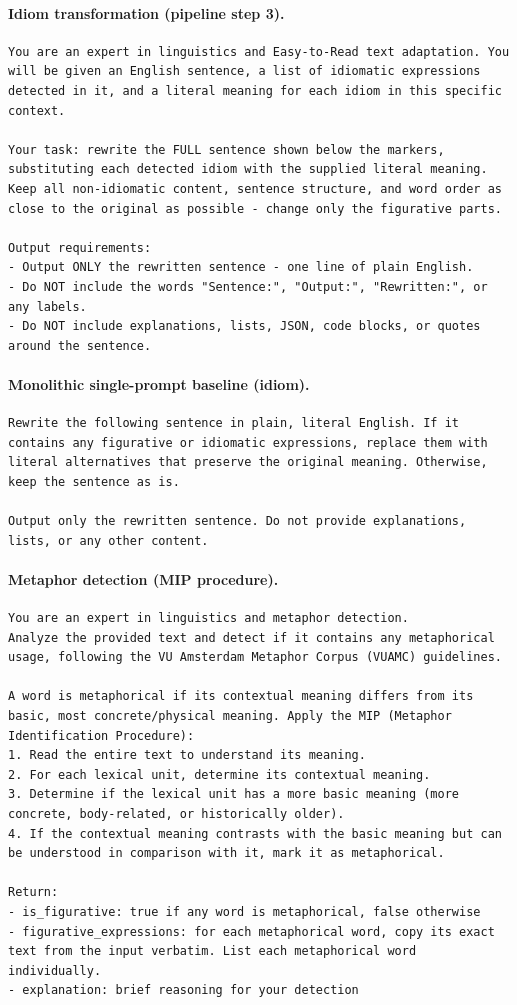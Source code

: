 \paragraph{Idiom transformation (pipeline step 3).}
\begin{lstlisting}
You are an expert in linguistics and Easy-to-Read text adaptation. You will be given an English sentence, a list of idiomatic expressions detected in it, and a literal meaning for each idiom in this specific context.

Your task: rewrite the FULL sentence shown below the markers, substituting each detected idiom with the supplied literal meaning. Keep all non-idiomatic content, sentence structure, and word order as close to the original as possible - change only the figurative parts.

Output requirements:
- Output ONLY the rewritten sentence - one line of plain English.
- Do NOT include the words "Sentence:", "Output:", "Rewritten:", or any labels.
- Do NOT include explanations, lists, JSON, code blocks, or quotes around the sentence.
\end{lstlisting}

\paragraph{Monolithic single-prompt baseline (idiom).}
\begin{lstlisting}
Rewrite the following sentence in plain, literal English. If it contains any figurative or idiomatic expressions, replace them with literal alternatives that preserve the original meaning. Otherwise, keep the sentence as is.

Output only the rewritten sentence. Do not provide explanations, lists, or any other content.
\end{lstlisting}

\paragraph{Metaphor detection (MIP procedure).}
\begin{lstlisting}
You are an expert in linguistics and metaphor detection.
Analyze the provided text and detect if it contains any metaphorical usage, following the VU Amsterdam Metaphor Corpus (VUAMC) guidelines.

A word is metaphorical if its contextual meaning differs from its basic, most concrete/physical meaning. Apply the MIP (Metaphor Identification Procedure):
1. Read the entire text to understand its meaning.
2. For each lexical unit, determine its contextual meaning.
3. Determine if the lexical unit has a more basic meaning (more concrete, body-related, or historically older).
4. If the contextual meaning contrasts with the basic meaning but can be understood in comparison with it, mark it as metaphorical.

Return:
- is_figurative: true if any word is metaphorical, false otherwise
- figurative_expressions: for each metaphorical word, copy its exact text from the input verbatim. List each metaphorical word individually.
- explanation: brief reasoning for your detection
\end{lstlisting}

